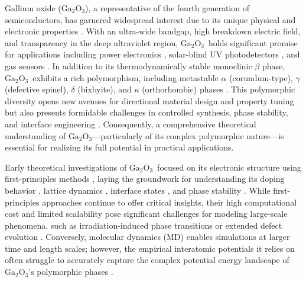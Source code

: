 \documentclass[%
reprint,
superscriptaddress,
 amsmath,amssymb,
 aps,
]{revtex4-2}
\newcommand{\ga}{$\text{Ga}_2\text{O}_3$}
\begin{document}
Gallium oxide (\ga), a representative of the fourth generation of 
semiconductors, has garnered widespread interest due to its unique physical and 
electronic properties \cite{pearton_review_2017}.
With an ultra-wide bandgap, high breakdown electric field, and transparency in the 
deep ultraviolet region, \ga\ holds significant promise for applications including power 
electronics \cite{tadjer_toward_2022}, solar-blind UV photodetectors \cite{pratiyush2019advances}, 
and gas sensors \cite{zhu_gallium_2022}. 
In addition to its thermodynamically stable monoclinic $\beta$ phase, \ga\ exhibits a 
rich polymorphism, including metastable $\alpha$ (corundum-type), $\gamma$ 
(defective spinel), $\delta$ (bixbyite), and $\kappa$ (orthorhombic) phases \cite{yoshioka_structures_2007}. 
This polymorphic diversity opens new avenues for directional material design and property 
tuning but also presents formidable challenges in controlled synthesis, phase stability, 
and interface engineering \cite{abdullaev_thermal_2024,galeckas_optical_2024,liu_band_2024,yakimov_depth_2025}.
Consequently, a comprehensive theoretical understanding of \ga---particularly of its 
complex polymorphic nature---is essential for realizing its full potential in practical 
applications.

Early theoretical investigations of \ga\ focused on its electronic structure 
using first-principles methods \cite{he_first-principles_2006,xu_structure_2007,yoshioka_structures_2007}, 
laying the groundwork for understanding its doping behavior \cite{varley_oxygen_2010}, 
lattice dynamics \cite{yan_phonon_2018,yang_lattice_2024}, 
interface states \cite{bermudez_structure_2006}, and phase stability \cite{fan_low-energy_2022}. 
While first-principles approaches continue to offer critical insights, their high computational 
cost and limited scalability pose significant challenges for modeling large-scale phenomena, 
such as irradiation-induced phase transitions or extended defect evolution 
\cite{azarov_disorder-induced_2021,han_unraveling_2025,klevtsov_nonlinear_2024,titov_density_2025,azarov_phase_2025}. 
Conversely, molecular dynamics (MD) enables simulations at larger time 
and length scales; however, the empirical interatomic potentials 
it relies on often struggle to accurately capture the complex potential energy landscape of 
\ga's polymorphic phases \cite{blanco_energetics_2005}. 
\end{document}
